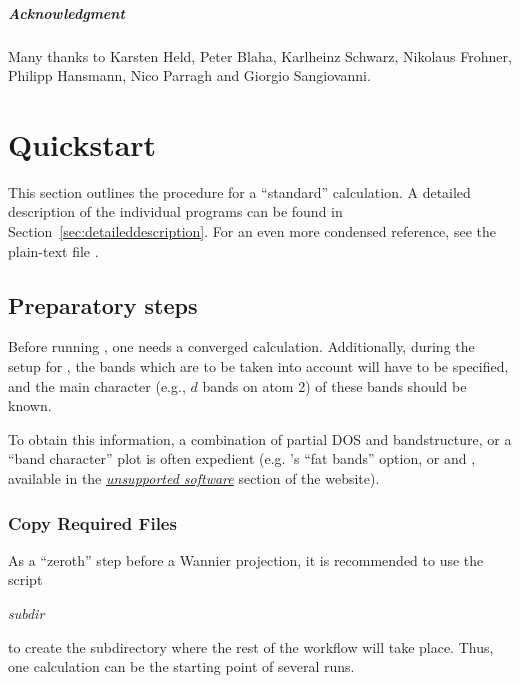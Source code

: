 \paragraph{Acknowledgment}
%
Many thanks to Karsten Held, Peter Blaha, Karlheinz Schwarz, Nikolaus
Frohner, Philipp Hansmann, Nico Parragh and Giorgio Sangiovanni.


\tableofcontents

\mainmatter


\chapter{Quickstart}
\label{sec:quickstart}
\minitoc

This section outlines the procedure for a ``standard'' \wtow
calculation.  A detailed description of the individual programs can be
found in Section~\ref{sec:detaileddescription}.  For an even more
condensed reference, see the plain-text file .


\section{Preparatory steps}
\label{sec:quickstart_prep}

Before running \wtow, one needs a converged \wien calculation.
Additionally, during the setup for \wtow, the bands which are to be
taken into account will have to be specified, and the main character
(e.g., $d$ bands on atom 2) of these bands should be known.

To obtain this information, a combination of partial DOS and
bandstructure, or a ``band character'' plot is often expedient
(e.g. 's ``fat bands'' option, or
\href{http://www.cpfs.mpg.de/haverkort/spaghetti_primavera}{}
and \href{https://eassmann.github.io/prima.py}{},
available in the
\href{http://www.wien2k.at/reg_user/unsupported/}{\textit{unsupported
    software}} section of the \wien website).


\subsection{Copy Required Files}

As a ``zeroth'' step before a Wannier projection, it is recommended to
use the script
\begin{usage}
  \prepwiiw \textit{subdir}
\end{usage}
to create the subdirectory  where the rest of
the workflow will take place. Thus, one \wien calculation can be the
starting point of several \wtow runs.


